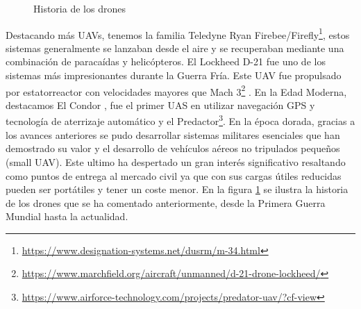 \begin{figure}[H]
  \begin{center}
  \caption{Historia de los drones}
  \label{f:Drones}
  \vspace{-1.5em}
  \end{center}
 \end{figure}

Destacando más UAVs, tenemos la familia Teledyne Ryan Firebee/Firefly\footnote{\url{https://www.designation-systems.net/dusrm/m-34.html}}, estos sistemas generalmente se lanzaban 
desde el aire y se recuperaban mediante una combinación de paracaídas y helicópteros. El Lockheed D-21 fue uno de los sistemas más impresionantes durante la Guerra Fría. 
Este UAV fue propulsado por estatorreactor con velocidades mayores que Mach 3\footnote{\url{https://www.marchfield.org/aircraft/unmanned/d-21-drone-lockheed/}} . 
En la Edad Moderna, destacamos El Condor \cite{CondorUAV}, fue el primer UAS en utilizar navegación GPS y tecnología de aterrizaje automático y el Predactor\footnote{\url{https://www.airforce-technology.com/projects/predator-uav/?cf-view}}. 
En la época dorada, gracias a los avances anteriores se pudo desarrollar sistemas militares esenciales que han demostrado su valor y el desarrollo de vehículos aéreos no 
tripulados pequeños (small UAV). Este ultimo ha despertado un gran interés significativo resaltando como puntos de entrega al mercado civil ya que con sus cargas útiles
reducidas pueden ser portátiles y tener un coste menor. 
En la figura \ref{f:Drones} se ilustra la historia de los drones que se ha comentado anteriormente, desde la Primera Guerra Mundial hasta la actualidad.

